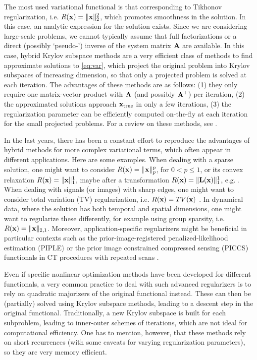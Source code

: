 \documentclass[11pt]{article}
\numberwithin{equation}{section}
\renewcommand{\t} {^{\top}}                                %
\newcommand{\bfA}{{\bf A}}
\newcommand{\bfL}{{\bf L}}
\newcommand{\bfx}{{\bf x}}
\begin{document}
The most used variational functional is that corresponding to Tikhonov regularization, i.e. $R(\bfx)=\|\bfx\|_2^2$, which promotes smoothness in the solution. In this case, an analytic expression for the solution exists. Since we are considering large-scale problems, we cannot typically assume that full factorizations or a direct (possibly `pseudo-') inverse of the system matrix $\bfA$ are available. In this case, hybrid Krylov subspace methods are a very efficient class of methods to find approximate solutions to \eqref{eq:var}, which project the original problem into Krylov subspaces of increasing dimension, so that only a projected problem is solved at each iteration. The advantages of these methods are as follows: (1) they only require one matrix-vector product with $\bfA$ (and possibly $\bfA\t$) per iteration, (2) the approximated solutions approach $\bfx_{\text{true}}$ in only a few iterations, (3) the regularization parameter can be efficiently computed on-the-fly at each iteration for the small projected problems. For a review on these methods, see \cite{Chung2024survey}.

In the last years, there has been a constant effort to reproduce the advantages of hybrid methods for more complex variational terms, which often appear in different applications. Here are some examples. When dealing with a sparse solution, one might want to consider $R(\bfx)=\|\bfx\|_p^p$, for $0 <p\leq 1$, or its convex relaxation $R(\bfx)=\|\bfx\|_1^1$, maybe after a transformation $R(\bfx)=\|\bfL(\bfx)\|_1^1$, e.g. \cite{Fornasier2010CS}. When dealing with signals (or images) with sharp edges, one might want to consider total variation (TV) regularization, i.e. $R(\bfx)=TV(\bfx)$ \cite{rudin1992nonlinear}. In dynamical data, where the solution has both temporal and spatial dimensions, one might want to regularize these differently, for example using group sparsity, i.e. $R(\bfx)=\|\bfx\|_{2,1}$. Moreover, application-specific regularizers might be beneficial in particular contexts such as the prior-image-registered penalized-likelihood estimation (PIPLE) \cite{Stayman2013PIRPLE} or the prior image constrained compressed sensing ({PICCS}) functionals in CT procedures with repeated scans \cite{hatamikia2023source,hastings2025PICCS}.

Even if specific nonlinear optimization methods have been developed for different functionals, a very common practice to deal with such advanced regularizers is to rely on quadratic majorizers of the original functional instead. These can then be (partially) solved using Krylov subspace methods, leading to a descent step in the original functional. Traditionally, a new Krylov subspace is built for each subproblem, leading to inner-outer schemes of iterations, which are not ideal for computational efficiency. One has to mention, however, that these methods rely on short recurrences (with some caveats for varying regularization parameters), so they are very memory efficient.
\end{document}
